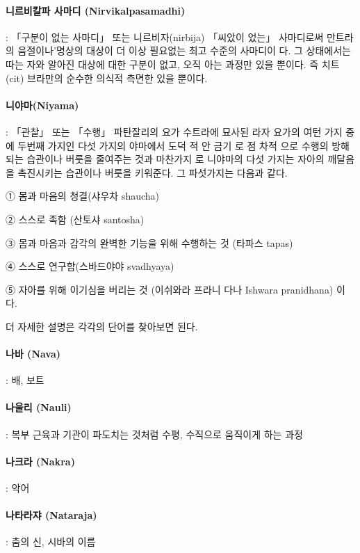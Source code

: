 \documentclass[12pt, a4paper, oneside]{book}
\begin{document}
\paragraph{니르비칼파 사마디 (Nirvikalpasamadhi)} : 「구분이 없는 사마디」 또는 니르비자(nirbija) 「씨았이 었는」 사마디로써 만트라의 음절이나'명상의 대상이 더 이상 필요없는 최고    수준의 사마디이 다. 그 상태에서는 따는 자와 알아진 대상에 대한 구분이 없고, 오직 아는 과정만 있을 뿐이다. 즉 치트(cit) 브라만의 순수한 의식적 측면한 있을 뿐이다.

\paragraph{니야마(Niyama)} : 「관찰」 또는 「수행」 파탄잘리의 요가 수트라에 묘사된 라자 요가의 여턴 가지 중에 두번째 가지인 다섯 가지의 야마에서 도덕 적 안 금기 로 점 차적 으로 수행의 방해되는 습관이나 버룻을 줄여주는 것과 마찬가지 로 니야마의 다섯 가지는 자아의 깨달음을 촉진시키는 습관이나 버룻을 키워준다. 그 파섯가지는 다음과 같다.

   ① 몸과 마음의 청결(샤우차 shaucha)

   ② 스스로 족함 (산토샤 santosha)

   ③ 몸과 마음과 감각의 완벽한 기능을 위해 수행하는 것 (타파스 tapas)

   ④ 스스로 연구함(스바드야야 svadhyaya)

   ⑤ 자아를 위해 이기심을 버리는 것 (이쉬와라 프라니 다나 Ishwara pranidhana) 이다.

       더 자세한 설명은 각각의 단어를 찾아보면 된다.

\paragraph{나바 (Nava)} : 배, 보트

\paragraph{나울리 (Nauli)} : 복부 근육과 기관이 파도치는 것처럼 수평, 수직으로 움직이게 하는 과정

\paragraph{나크라 (Nakra)} : 악어

\paragraph{나타라쟈 (Nataraja)} : 춤의 신, 시바의 이름
\end{document}
